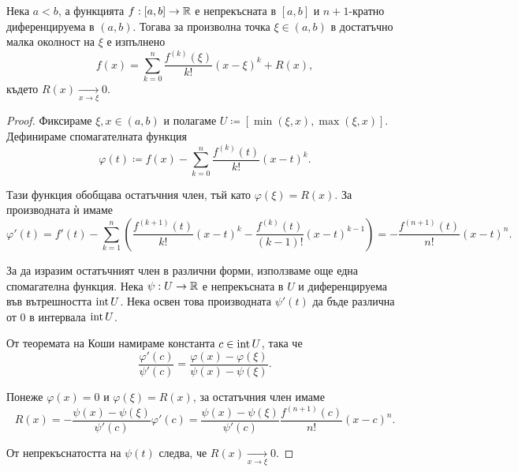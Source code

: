 \documentclass[numbers=endperiod, DIV=15, bibliography=totocnumbered]{scrartcl}
\begin{document}
\begin{theorem}[Тейлър]
  Нека $a < b$, а функцията $f: [a, b] \to \mathbb{R}$ е непрекъсната в $[a, b]$ и $n+1$-кратно диференцируема в $(a, b)$. Тогава за произволна точка $\xi \in (a, b)$ в достатъчно малка околност на $\xi$ е изпълнено
  \begin{displaymath}
    f(x) = \sum_{k=0}^n \frac {f^{(k)}(\xi)} {k!} {(x-\xi)}^k + R(x),
  \end{displaymath}
  където $R(x) \underset {x \to \xi} \longrightarrow 0$.
\end{theorem}
\begin{proof}
  Фиксираме $\xi, x \in (a, b)$ и полагаме $U \coloneqq [\min(\xi, x), \max(\xi, x)]$. Дефинираме спомагателната функция
  \begin{displaymath}
    \varphi(t) \coloneqq f(x) - \sum_{k=0}^n \frac {f^{(k)}(t)} {k!} {(x-t)}^k.
  \end{displaymath}

  Тази функция обобщава остатъчния член, тъй като $\varphi(\xi) = R(x)$. За производната ѝ имаме
  \begin{displaymath}
    \varphi'(t)
    =
    f'(t) -\sum_{k=1}^n \left( \frac {f^{(k+1)}(t)} {k!} {(x-t)}^k - \frac {f^{(k)}(t)} {(k-1)!} {(x-t)}^{k-1} \right)
    =
    - \frac {f^{(n+1)}(t)} {n!} {(x-t)}^n.
  \end{displaymath}

  За да изразим остатъчният член в различни форми, използваме още една спомагателна функция. Нека $\psi: U \to \mathbb{R}$ е непрекъсната в $U$ и диференцируема във вътрешността $\operatorname{int} U$. Нека освен това производната $\psi'(t)$ да бъде различна от $0$ в интервала $\operatorname{int} U$.

  От теоремата на Коши намираме константа $c \in \operatorname{int} U$, така че
  \begin{displaymath}
    \frac {\varphi'(c)} {\psi'(c)}
    =
    \frac {\varphi(x) - \varphi(\xi)} {\psi(x) - \psi(\xi)}.
  \end{displaymath}

  Понеже $\varphi(x) = 0$ и $\varphi(\xi) = R(x)$, за остатъчния член имаме
  \begin{displaymath}
    R(x)
    =
    -\frac {\psi(x) - \psi(\xi)} {\psi'(c)} \varphi'(c)
    =
    \frac {\psi(x) - \psi(\xi)} {\psi'(c)} \frac {f^{(n+1)}(c)} {n!} {(x-c)}^n.
  \end{displaymath}

  От непрекъснатостта на $\psi(t)$ следва, че $R(x) \underset {x \to \xi} \longrightarrow 0$.
\end{proof}
\end{document}
